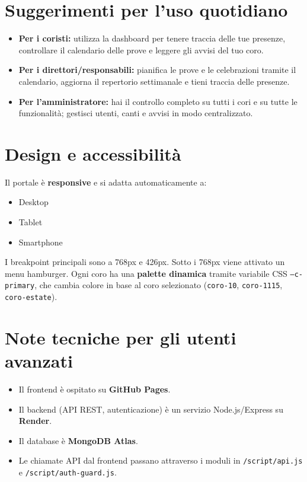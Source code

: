\documentclass[a4paper,12pt]{article}
\begin{document}
	\section{Suggerimenti per l'uso quotidiano}
	
	\begin{itemize}
		\item \textbf{Per i coristi:} utilizza la dashboard per tenere traccia delle tue presenze, controllare il calendario delle prove e leggere gli avvisi del tuo coro.
		\item \textbf{Per i direttori/responsabili:} pianifica le prove e le celebrazioni tramite il calendario, aggiorna il repertorio settimanale e tieni traccia delle presenze.
		\item \textbf{Per l'amministratore:} hai il controllo completo su tutti i cori e su tutte le funzionalità; gestisci utenti, canti e avvisi in modo centralizzato.
	\end{itemize}
	
	\section{Design e accessibilità}
	
	Il portale è \textbf{responsive} e si adatta automaticamente a:
	\begin{itemize}
		\item Desktop
		\item Tablet
		\item Smartphone
	\end{itemize}
	
	I breakpoint principali sono a 768px e 426px.  
	Sotto i 768px viene attivato un menu hamburger.  
	Ogni coro ha una \textbf{palette dinamica} tramite variabile CSS \texttt{--c-primary}, che cambia colore in base al coro selezionato (\texttt{coro-10}, \texttt{coro-1115}, \texttt{coro-estate}).
	
	\section{Note tecniche per gli utenti avanzati}
	
	\begin{itemize}
		\item Il frontend è ospitato su \textbf{GitHub Pages}.
		\item Il backend (API REST, autenticazione) è un servizio Node.js/Express su \textbf{Render}.
		\item Il database è \textbf{MongoDB Atlas}.
		\item Le chiamate API dal frontend passano attraverso i moduli in \texttt{/script/api.js} e \texttt{/script/auth-guard.js}.
	\end{itemize}
	
\end{document}
